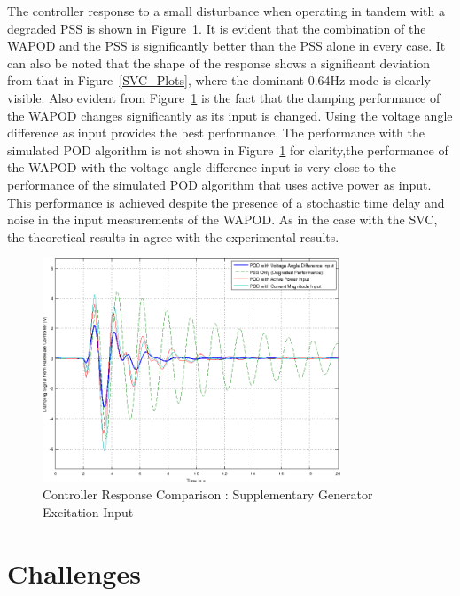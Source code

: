 \documentclass[journal]{IEEEtran}
\begin{document}
The controller response to a small disturbance when operating in tandem with a degraded PSS is shown in Figure~\ref{Generator_Plots}. It is evident that the combination of the WAPOD and the PSS is significantly better than the PSS alone in every case. It can also be noted that the shape of the response shows a significant deviation from that in Figure~\ref{SVC_Plots}, where the dominant 0.64Hz mode is clearly visible. Also evident from Figure~\ref{Generator_Plots} is the fact that the damping performance of the WAPOD changes significantly as its input is changed. Using the voltage angle difference as input provides the best performance. The performance with the simulated POD algorithm is not shown in Figure~\ref{Generator_Plots} for clarity,the performance of the WAPOD with the voltage angle difference input is very close to the performance of the simulated POD algorithm that uses active power as input. This performance is achieved despite the presence of a stochastic time delay and noise in the input measurements of the WAPOD. As in the case with the SVC, the theoretical results in \cite{Yuwa} agree with the experimental results.

\begin{figure}[!th]
\centering
\includegraphics[width=3.5in]{Wide_Area_ResponseComparison_SamePlot.png}
\caption{Controller Response Comparison : Supplementary Generator Excitation Input}
\label{Generator_Plots}
\end{figure}


\section{Challenges}\label{Challenges}
\end{document}
